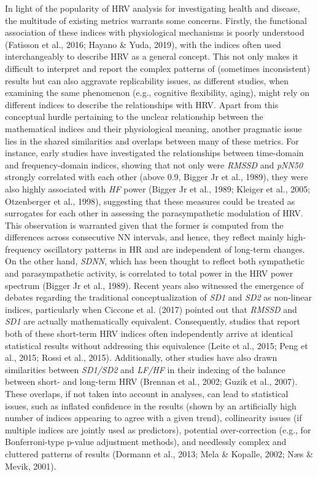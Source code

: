 \documentclass[
  english,
  jou,floatsintext]{apa6}
\begin{document}
In light of the popularity of HRV analysis for investigating health and disease, the multitude of existing metrics warrants some concerns. Firstly, the functional association of these indices with physiological mechanisms is poorly understood (Fatisson et al., 2016; Hayano \& Yuda, 2019), with the indices often used interchangeably to describe HRV as a general concept. This not only makes it difficult to interpret and report the complex patterns of (sometimes inconsistent) results but can also aggravate replicability issues, as different studies, when examining the same phenomenon (e.g., cognitive flexibility, aging), might rely on different indices to describe the relationships with HRV. Apart from this conceptual hurdle pertaining to the unclear relationship between the mathematical indices and their physiological meaning, another pragmatic issue lies in the shared similarities and overlaps between many of these metrics. For instance, early studies have investigated the relationships between time-domain and frequency-domain indices, showing that not only were \emph{RMSSD} and \emph{pNN50} strongly correlated with each other (above 0.9, Bigger Jr et al., 1989), they were also highly associated with \emph{HF} power (Bigger Jr et al., 1989; Kleiger et al., 2005; Otzenberger et al., 1998), suggesting that these measures could be treated as surrogates for each other in assessing the parasympathetic modulation of HRV. This observation is warranted given that the former is computed from the differences across consecutive NN intervals, and hence, they reflect mainly high-frequency oscillatory patterns in HR and are independent of long-term changes. On the other hand, \emph{SDNN}, which has been thought to reflect both sympathetic and parasympathetic activity, is correlated to total power in the HRV power spectrum (Bigger Jr et al., 1989). Recent years also witnessed the emergence of debates regarding the traditional conceptualization of \emph{SD1} and \emph{SD2} as non-linear indices, particularly when Ciccone et al. (2017) pointed out that \emph{RMSSD} and \emph{SD1} are actually mathematically equivalent. Consequently, studies that report both of these short-term HRV indices often independently arrive at identical statistical results without addressing this equivalence (Leite et al., 2015; Peng et al., 2015; Rossi et al., 2015). Additionally, other studies have also drawn similarities between \emph{SD1/SD2} and \emph{LF/HF} in their indexing of the balance between short- and long-term HRV (Brennan et al., 2002; Guzik et al., 2007). These overlaps, if not taken into account in analyses, can lead to statistical issues, such as inflated confidence in the results (shown by an artificially high number of indices appearing to agree with a given trend), collinearity issues (if multiple indices are jointly used as predictors), potential over-correction (e.g., for Bonferroni-type p-value adjustment methods), and needlessly complex and cluttered patterns of results (Dormann et al., 2013; Mela \& Kopalle, 2002; Næs \& Mevik, 2001).
\end{document}
